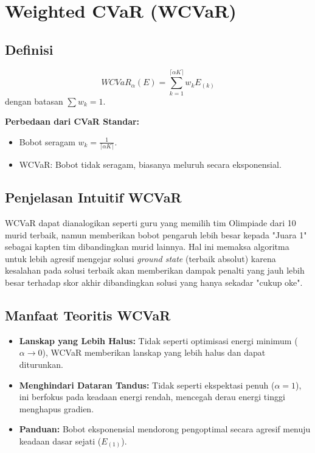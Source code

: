 \section{Weighted CVaR (WCVaR)}

\subsection{Definisi}

\begin{equation}
    WCVaR_\alpha(E) = \sum_{k=1}^{\lceil \alpha K \rceil} w_k E_{(k)}
\end{equation}
dengan batasan $\sum w_k = 1$.

\textbf{Perbedaan dari CVaR Standar:}
\begin{itemize}
    \item Bobot seragam $w_k = \frac{1}{\lceil \alpha K \rceil}$.
    \item WCVaR: Bobot tidak seragam, biasanya meluruh secara eksponensial.
\end{itemize}

\subsection{Penjelasan Intuitif WCVaR}

WCVaR dapat dianalogikan seperti guru yang memilih tim Olimpiade dari 10 murid terbaik, namun memberikan bobot pengaruh lebih besar kepada "Juara 1" sebagai kapten tim dibandingkan murid lainnya. Hal ini memaksa algoritma untuk lebih agresif mengejar solusi \textit{ground state} (terbaik absolut) karena kesalahan pada solusi terbaik akan memberikan dampak penalti yang jauh lebih besar terhadap skor akhir dibandingkan solusi yang hanya sekadar "cukup oke".

\subsection{Manfaat Teoritis WCVaR}

\begin{itemize}
    \item \textbf{Lanskap yang Lebih Halus:} Tidak seperti optimisasi energi minimum ($\alpha \to 0$), WCVaR memberikan lanskap yang lebih halus dan dapat diturunkan.
    \item \textbf{Menghindari Dataran Tandus:} Tidak seperti ekspektasi penuh ($\alpha=1$), ini berfokus pada keadaan energi rendah, mencegah derau energi tinggi menghapus gradien.
    \item \textbf{Panduan:} Bobot eksponensial mendorong pengoptimal secara agresif menuju keadaan dasar sejati ($E_{(1)}$).
\end{itemize}

